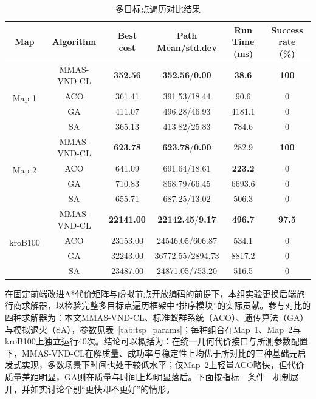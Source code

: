 \documentclass[lettersize,journal]{IEEEtran}
\begin{document}
\begin{table}[!t]
\caption{多目标点遍历对比结果}
\label{tab:tsp_cmp}
\centering
\scriptsize
\setlength{\tabcolsep}{2.5pt}
\begin{tabular}{cccccc}
\toprule
Map & Algorithm & Best cost & \makecell{Path\\Mean/std.dev} & \makecell{Run Time\\(ms)} & \makecell{Success rate\\(\%)} \\
\midrule
 \multirow{4}{*}{Map 1} & MMAS-VND-CL & \textbf{352.56} & \textbf{352.56}/\textbf{0.00} & \textbf{38.6} & \textbf{100} \\
   & ACO & 361.41 & 391.53/18.44 & 90.6 & 0 \\
   & GA & 411.07 & 496.28/46.93 & 4181.1 & 0 \\
   & SA & 365.13 & 413.82/25.83 & 784.6 & 0 \\
\midrule
 \multirow{4}{*}{Map 2} & MMAS-VND-CL & \textbf{623.78} & \textbf{623.78}/\textbf{0.00} & 282.9 & \textbf{100} \\
   & ACO & 641.09 & 691.64/18.61 & \textbf{223.2} & 0 \\
   & GA & 710.83 & 868.79/66.45 & 6693.6 & 0 \\
   & SA & 655.71 & 687.25/13.02 & 506.3 & 0 \\
\midrule
 \multirow{4}{*}{kroB100} & MMAS-VND-CL & \textbf{22141.00} & \textbf{22142.45}/\textbf{9.17} & \textbf{496.7} & \textbf{97.5} \\
   & ACO & 23153.00 & 24546.05/606.87 & 534.1 & 0 \\
   & GA & 32243.00 & 36772.55/2894.73 & 8817.2 & 0 \\
   & SA & 23487.00 & 24871.05/753.20 & 516.5 & 0 \\
\bottomrule
\end{tabular}
\end{table}

在固定前端改进A*代价矩阵与虚拟节点开放编码的前提下，本组实验更换后端旅行商求解器，以检验完整多目标点遍历框架中“排序模块”的实际贡献。参与对比的四种求解器为：本文MMAS-VND-CL、标准蚁群系统（ACO）、遗传算法（GA）与模拟退火（SA），参数见表~\textcolor{blue}{\ref{tab:tsp_params}}；每种组合在Map~1、Map~2与kroB100上独立运行40次。结论可以概括为：在统一几何代价接口与所测参数配置下，MMAS-VND-CL在解质量、成功率与稳定性上均优于所对比的三种基础元启发式实现，多数场景下时间也处于较低水平；仅Map~2上轻量ACO略快，但代价质量差距明显，GA则在质量与时间上均明显落后。下面按指标—条件—机制展开，并如实讨论个别“更快却不更好”的情形。
\end{document}
